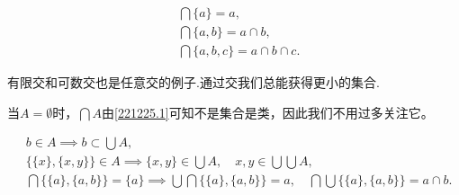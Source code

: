\begin{example}
    \begin{align*}
        &\bigcap\{a\}=a,\\
        &\bigcap\{a,b\}=a\cap b,\\
        &\bigcap\{a,b,c\}=a\cap b\cap c.
    \end{align*}
\end{example}
有限交和可数交也是任意交的例子.通过交我们总能获得更小的集合.

当$A=\emptyset$时，$\bigcap A$由\ref{221225.1}可知不是集合是类，因此我们不用过多关注它。

\begin{example}
    \begin{align*}
        &b\in A\implies b\subset\bigcup A,\\
        &\{\{x\},\{x,y\}\}\in A\implies \{x,y\}\in\bigcup A,\quad x,y\in\bigcup\bigcup A,\\
        &\bigcap\{\{a\},\{a,b\}\}=\{a\}\implies\bigcup\bigcap\{\{a\},\{a,b\}\}=a,\quad \bigcap\bigcup\{\{a\},\{a,b\}\}=a\cap b.
    \end{align*}
\end{example}
